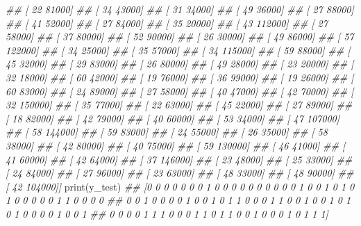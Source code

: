\documentclass[
]{book}
\newenvironment{Shaded}{\begin{snugshade}}{\end{snugshade}}
\newcommand{\BuiltInTok}[1]{#1}
\newcommand{\CommentTok}[1]{\textcolor[rgb]{0.56,0.35,0.01}{\textit{#1}}}
\newcommand{\NormalTok}[1]{#1}
\theoremstyle{definition}
\theoremstyle{definition}
\theoremstyle{definition}
\theoremstyle{definition}
\theoremstyle{remark}
\begin{document}
\begin{Shaded}
\begin{Highlighting}[]
\CommentTok{\#\#  [    22  81000]}
\CommentTok{\#\#  [    34  43000]}
\CommentTok{\#\#  [    31  34000]}
\CommentTok{\#\#  [    49  36000]}
\CommentTok{\#\#  [    27  88000]}
\CommentTok{\#\#  [    41  52000]}
\CommentTok{\#\#  [    27  84000]}
\CommentTok{\#\#  [    35  20000]}
\CommentTok{\#\#  [    43 112000]}
\CommentTok{\#\#  [    27  58000]}
\CommentTok{\#\#  [    37  80000]}
\CommentTok{\#\#  [    52  90000]}
\CommentTok{\#\#  [    26  30000]}
\CommentTok{\#\#  [    49  86000]}
\CommentTok{\#\#  [    57 122000]}
\CommentTok{\#\#  [    34  25000]}
\CommentTok{\#\#  [    35  57000]}
\CommentTok{\#\#  [    34 115000]}
\CommentTok{\#\#  [    59  88000]}
\CommentTok{\#\#  [    45  32000]}
\CommentTok{\#\#  [    29  83000]}
\CommentTok{\#\#  [    26  80000]}
\CommentTok{\#\#  [    49  28000]}
\CommentTok{\#\#  [    23  20000]}
\CommentTok{\#\#  [    32  18000]}
\CommentTok{\#\#  [    60  42000]}
\CommentTok{\#\#  [    19  76000]}
\CommentTok{\#\#  [    36  99000]}
\CommentTok{\#\#  [    19  26000]}
\CommentTok{\#\#  [    60  83000]}
\CommentTok{\#\#  [    24  89000]}
\CommentTok{\#\#  [    27  58000]}
\CommentTok{\#\#  [    40  47000]}
\CommentTok{\#\#  [    42  70000]}
\CommentTok{\#\#  [    32 150000]}
\CommentTok{\#\#  [    35  77000]}
\CommentTok{\#\#  [    22  63000]}
\CommentTok{\#\#  [    45  22000]}
\CommentTok{\#\#  [    27  89000]}
\CommentTok{\#\#  [    18  82000]}
\CommentTok{\#\#  [    42  79000]}
\CommentTok{\#\#  [    40  60000]}
\CommentTok{\#\#  [    53  34000]}
\CommentTok{\#\#  [    47 107000]}
\CommentTok{\#\#  [    58 144000]}
\CommentTok{\#\#  [    59  83000]}
\CommentTok{\#\#  [    24  55000]}
\CommentTok{\#\#  [    26  35000]}
\CommentTok{\#\#  [    58  38000]}
\CommentTok{\#\#  [    42  80000]}
\CommentTok{\#\#  [    40  75000]}
\CommentTok{\#\#  [    59 130000]}
\CommentTok{\#\#  [    46  41000]}
\CommentTok{\#\#  [    41  60000]}
\CommentTok{\#\#  [    42  64000]}
\CommentTok{\#\#  [    37 146000]}
\CommentTok{\#\#  [    23  48000]}
\CommentTok{\#\#  [    25  33000]}
\CommentTok{\#\#  [    24  84000]}
\CommentTok{\#\#  [    27  96000]}
\CommentTok{\#\#  [    23  63000]}
\CommentTok{\#\#  [    48  33000]}
\CommentTok{\#\#  [    48  90000]}
\CommentTok{\#\#  [    42 104000]]}
\BuiltInTok{print}\NormalTok{(y\_test)}
\CommentTok{\#\# [0 0 0 0 0 0 0 1 0 0 0 0 0 0 0 0 0 0 1 0 0 1 0 1 0 1 0 0 0 0 0 1 1 0 0 0 0}
\CommentTok{\#\#  0 0 1 0 0 0 0 1 0 0 1 0 1 1 0 0 0 1 1 0 0 1 0 0 1 0 1 0 1 0 0 0 0 1 0 0 1}
\CommentTok{\#\#  0 0 0 0 1 1 1 0 0 0 1 1 0 1 1 0 0 1 0 0 0 1 0 1 1 1]}
\end{Highlighting}
\end{Shaded}
\end{document}
